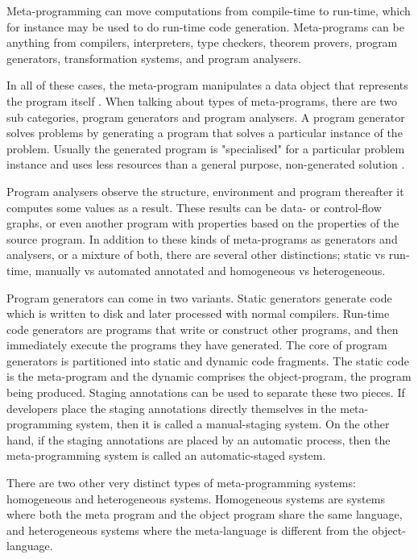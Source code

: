 Meta-programming can move computations from compile-time to run-time, which for instance may be used to do run-time code generation. Meta-programs can be anything from compilers, interpreters, type checkers, theorem provers, program generators, transformation systems, and program analysers.

In all of these cases, the meta-program manipulates a data object that represents the program itself \cite{sheard2001accomplishments}. When talking about types of meta-programs, there are two sub categories, program generators and program analysers\cite{pasalic2004role}. A program generator solves problems by generating a program that solves a particular instance of the problem. Usually the generated program is "specialised" for a particular problem instance and uses less resources than a general purpose, non-generated solution \cite{sheard2001accomplishments}.

Program analysers observe the structure, environment and program thereafter it computes some values as a result.  These results can be data- or control-flow graphs, or even another program with properties based on the properties of the source program\cite{sheard2001accomplishments}. In addition to these kinds of meta-programs as generators and analysers, or a mixture of both, there are several other distinctions; static vs run-time, manually vs automated annotated and homogeneous vs heterogeneous.

Program generators can come in two variants. Static generators generate code which is written to disk and later processed with normal compilers\cite{czarnecki2002generative}. Run-time code generators are programs that write or construct other programs, and then immediately execute the programs they have generated. The core of program generators is partitioned into static and dynamic code fragments\cite{sztipanovits2002generative}. The static code is the meta-program and the dynamic comprises the object-program, the program being produced. Staging annotations can be used to separate these two pieces\cite{sztipanovits2002generative}. If developers place the staging annotations directly themselves in the meta-programming system, then it is called a manual-staging system. On the other hand, if the staging annotations are placed by an automatic process, then the meta-programming system is called an automatic-staged system\cite{sztipanovits2002generative}.

There are two other very distinct types of meta-programming systems: homogeneous and heterogeneous systems. 
Homogeneous systems are systems where both the meta program and the object program share the same language, and heterogeneous systems where the meta-language is different from the object-language\cite{sheard2001accomplishments}.

